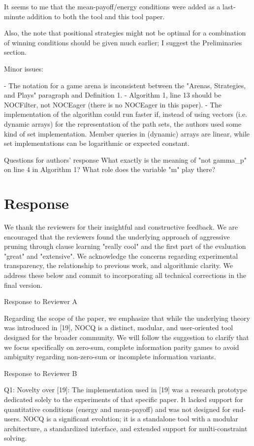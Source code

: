 \documentclass{article}
\begin{document}
\begin{reviewer}
It seems to me that the mean-payoff/energy conditions were added as a last-minute addition to both the tool and this tool paper.

Also, the note that positional strategies might not be optimal for a combination of winning conditions should be given much earlier; I suggest the Preliminaries section. 

Minor issues:

- The notation for a game arena is inconsistent between the "Arenas, Strategies, and Plays" paragraph and Definition 1.
- Algorithm 1, line 13 should be NOCFilter, not NOCEager (there is no NOCEager in this paper).
- The implementation of the algorithm could run faster if, instead of using vectors (i.e. dynamic arrays) for the representation of the path sets, the authors used some kind of set implementation. Member queries in (dynamic) arrays are linear, while set implementations can be logarithmic or expected constant.

Questions for authors’ response
What exactly is the meaning of "not gamma_p" on line 4 in Algorithm 1? What role does the variable "m" play there?
\end{reviewer}

\section{Response}

We thank the reviewers for their insightful and constructive feedback. We are encouraged that the reviewers found the underlying approach of aggressive pruning through clause learning "really cool" and the first part of the evaluation "great" and "extensive". We acknowledge the concerns regarding experimental transparency, the relationship to previous work, and algorithmic clarity. We address these below and commit to incorporating all technical corrections in the final version.

Response to Reviewer A

Regarding the scope of the paper, we emphasize that while the underlying theory was introduced in [19], NOCQ is a distinct, modular, and user-oriented tool designed for the broader community. We will follow the suggestion to clarify that we focus specifically on zero-sum, complete information parity games to avoid ambiguity regarding non-zero-sum or incomplete information variants.

Response to Reviewer B

Q1: Novelty over [19]: The implementation used in [19] was a research prototype dedicated solely to the experiments of that specific paper. It lacked support for quantitative conditions (energy and mean-payoff) and was not designed for end-users. NOCQ is a significant evolution; it is a standalone tool with a modular architecture, a standardized interface, and extended support for multi-constraint solving.
\end{document}
